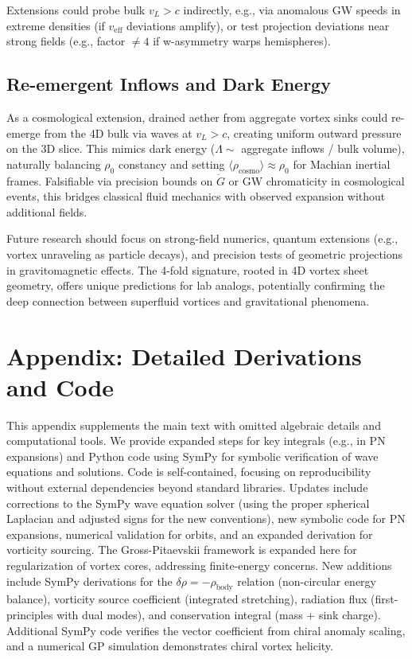 \documentclass{article}
\begin{document}
Extensions could probe bulk $v_L > c$ indirectly, e.g., via anomalous GW speeds in extreme densities (if $v_{\text{eff}}$ deviations amplify), or test projection deviations near strong fields (e.g., factor $\neq 4$ if w-asymmetry warps hemispheres).

\subsection{Re-emergent Inflows and Dark Energy}

As a cosmological extension, drained aether from aggregate vortex sinks could re-emerge from the 4D bulk via waves at $v_L > c$, creating uniform outward pressure on the 3D slice. This mimics dark energy ($\Lambda \sim$ aggregate inflows / bulk volume), naturally balancing $\rho_0$ constancy and setting $\langle \rho_{\text{cosmo}} \rangle \approx \rho_0$ for Machian inertial frames. Falsifiable via precision bounds on $\dot{G}$ or GW chromaticity in cosmological events, this bridges classical fluid mechanics with observed expansion without additional fields.

Future research should focus on strong-field numerics, quantum extensions (e.g., vortex unraveling as particle decays), and precision tests of geometric projections in gravitomagnetic effects. The 4-fold signature, rooted in 4D vortex sheet geometry, offers unique predictions for lab analogs, potentially confirming the deep connection between superfluid vortices and gravitational phenomena.

\section{Appendix: Detailed Derivations and Code}

This appendix supplements the main text with omitted algebraic details and computational tools. We provide expanded steps for key integrals (e.g., in PN expansions) and Python code using SymPy for symbolic verification of wave equations and solutions. Code is self-contained, focusing on reproducibility without external dependencies beyond standard libraries. Updates include corrections to the SymPy wave equation solver (using the proper spherical Laplacian and adjusted signs for the new conventions), new symbolic code for PN expansions, numerical validation for orbits, and an expanded derivation for vorticity sourcing. The Gross-Pitaevskii framework is expanded here for regularization of vortex cores, addressing finite-energy concerns. New additions include SymPy derivations for the $\delta\rho = -\rho_{\text{body}}$ relation (non-circular energy balance), vorticity source coefficient (integrated stretching), radiation flux (first-principles with dual modes), and conservation integral (mass + sink charge). Additional SymPy code verifies the vector coefficient from chiral anomaly scaling, and a numerical GP simulation demonstrates chiral vortex helicity.
\end{document}
